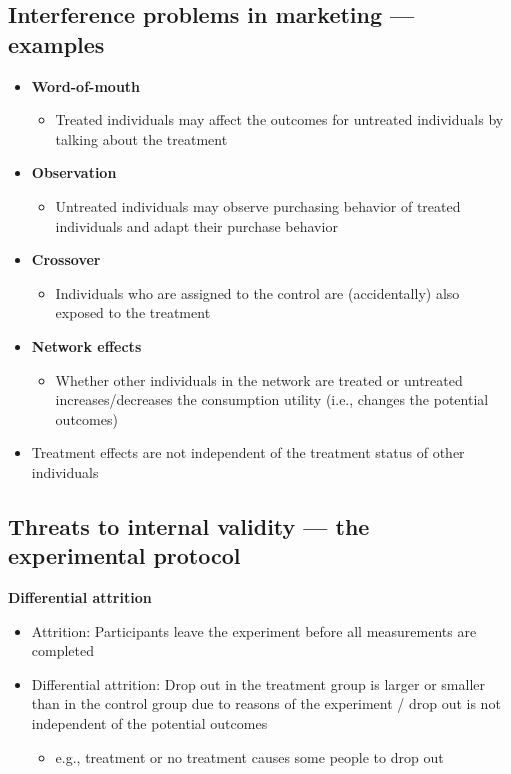 \documentclass[10pt]{article}
\begin{document}
\subsection{Interference problems in marketing --- examples}
\begin{itemize}
    \item \textbf{Word-of-mouth}
    \begin{itemize}
        \item Treated individuals may affect the outcomes for untreated individuals by talking about the treatment 
    \end{itemize}
    \item \textbf{Observation}
    \begin{itemize}
        \item Untreated individuals may observe purchasing behavior of treated individuals and adapt their purchase behavior
    \end{itemize}
    \item \textbf{Crossover}
    \begin{itemize}
        \item Individuals who are assigned to the control are (accidentally) also exposed to the treatment 
    \end{itemize}
    \item \textbf{Network effects}
    \begin{itemize}
        \item Whether other individuals in the network are treated or untreated increases/decreases the consumption utility (i.e., changes the potential outcomes)
    \end{itemize}
    \item Treatment effects are not independent of the treatment status of other individuals 
\end{itemize}
\newpage 
\subsection{Threats to internal validity --- the experimental protocol}
\textbf{Differential attrition}
\begin{itemize}
    \item Attrition: Participants leave the experiment before all measurements are completed 
    \item Differential attrition: Drop out in the treatment group is larger or smaller than in the control group due to reasons of the experiment / drop out is not independent of the potential outcomes 
    \begin{itemize}
        \item e.g., treatment or no treatment causes some people to drop out 
    \end{itemize}
\end{itemize}
\end{document}

